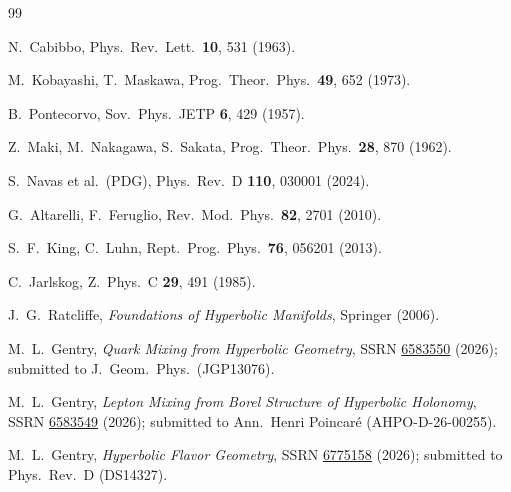 \documentclass[11pt,a4paper]{article}
\theoremstyle{definition}
\theoremstyle{remark}
\begin{document}
\begin{thebibliography}{99}

N.~Cabibbo, Phys.\ Rev.\ Lett.\ \textbf{10}, 531 (1963).

M.~Kobayashi, T.~Maskawa,
Prog.\ Theor.\ Phys.\ \textbf{49}, 652 (1973).

B.~Pontecorvo, Sov.\ Phys.\ JETP \textbf{6}, 429 (1957).

Z.~Maki, M.~Nakagawa, S.~Sakata,
Prog.\ Theor.\ Phys.\ \textbf{28}, 870 (1962).

S.~Navas et al.\ (PDG),
Phys.\ Rev.\ D \textbf{110}, 030001 (2024).

G.~Altarelli, F.~Feruglio,
Rev.\ Mod.\ Phys.\ \textbf{82}, 2701 (2010).

S.~F.~King, C.~Luhn,
Rept.\ Prog.\ Phys.\ \textbf{76}, 056201 (2013).

C.~Jarlskog,
Z.\ Phys.\ C \textbf{29}, 491 (1985).

J.~G.~Ratcliffe,
\textit{Foundations of Hyperbolic Manifolds}, Springer (2006).

M.~L.~Gentry,
\textit{Quark Mixing from Hyperbolic Geometry},
SSRN \href{https://doi.org/10.2139/ssrn.6583550}{6583550} (2026);
submitted to J.\ Geom.\ Phys.\ (JGP13076).

M.~L.~Gentry,
\textit{Lepton Mixing from Borel Structure of Hyperbolic Holonomy},
SSRN \href{https://doi.org/10.2139/ssrn.6583549}{6583549} (2026);
submitted to Ann.\ Henri Poincar\'e (AHPO-D-26-00255).

M.~L.~Gentry,
\textit{Hyperbolic Flavor Geometry},
SSRN \href{https://doi.org/10.2139/ssrn.6775158}{6775158} (2026);
submitted to Phys.\ Rev.\ D (DS14327).

\end{thebibliography}
\end{document}
